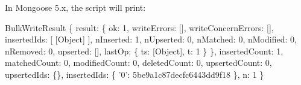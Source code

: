 In Mongoose 5.\+x, the script will print\+:


\begin{DoxyCode}
BulkWriteResult \{
  result: 
   \{ ok: 1,
     writeErrors: [],
     writeConcernErrors: [],
     insertedIds: [ [Object] ],
     nInserted: 1,
     nUpserted: 0,
     nMatched: 0,
     nModified: 0,
     nRemoved: 0,
     upserted: [],
     lastOp: \{ ts: [Object], t: 1 \} \},
  insertedCount: 1,
  matchedCount: 0,
  modifiedCount: 0,
  deletedCount: 0,
  upsertedCount: 0,
  upsertedIds: \{\},
  insertedIds: \{ '0': 5be9a1c87decfc6443dd9f18 \},
  n: 1 \}
\end{DoxyCode}
 
